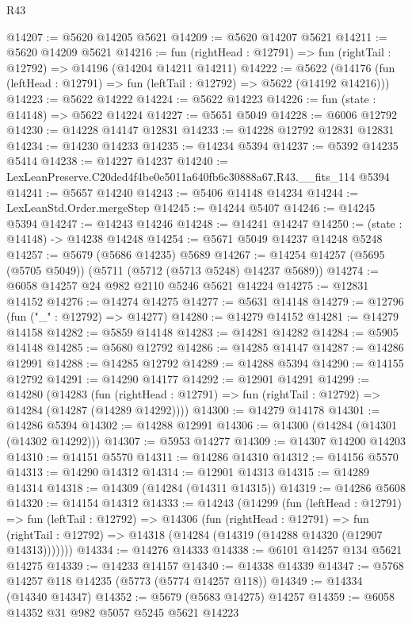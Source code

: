 \begin{lexlean}{R43}
\begin{coremodule}
@14207 := @5620 @14205 @5621
@14209 := @5620 @14207 @5621
@14211 := @5620 @14209 @5621
@14216 := fun (rightHead : @12791) => fun (rightTail : @12792) => @14196 (@14204 @14211 @14211)
@14222 := @5622
    (@14176 (fun (leftHead : @12791) => fun (leftTail : @12792) => @5622 (@14192 @14216)))
@14223 := @5622 @14222
@14224 := @5622 @14223
@14226 := fun (state : @14148) => @5622 @14224
@14227 := @5651 @5049
@14228 := @6006 @12792
@14230 := @14228 @14147 @12831
@14233 := @14228 @12792 @12831 @12831
@14234 := @14230 @14233
@14235 := @14234 @5394
@14237 := @5392 @14235 @5414
@14238 := @14227 @14237
@14240 := LexLeanPreserve.C20ded4f4be0e5011a640fb6c30888a67.R43.__fits_114 @5394
@14241 := @5657 @14240
@14243 := @5406 @14148 @14234
@14244 := LexLeanStd.Order.mergeStep
@14245 := @14244 @5407
@14246 := @14245 @5394
@14247 := @14243 @14246
@14248 := @14241 @14247
@14250 := (state : @14148) -> @14238 @14248
@14254 := @5671 @5049 @14237 @14248 @5248
@14257 := @5679 (@5686 @14235) @5689
@14267 := @14254 @14257 (@5695 (@5705 @5049)) (@5711 (@5712 (@5713 @5248) @14237 @5689))
@14274 := @6058 @14257 @24 @982 @2110 @5246 @5621 @14224
@14275 := @12831 @14152
@14276 := @14274 @14275
@14277 := @5631 @14148
@14279 := @12796 (fun ("_" : @12792) => @14277)
@14280 := @14279 @14152
@14281 := @14279 @14158
@14282 := @5859 @14148
@14283 := @14281 @14282
@14284 := @5905 @14148
@14285 := @5680 @12792
@14286 := @14285 @14147
@14287 := @14286 @12991
@14288 := @14285 @12792
@14289 := @14288 @5394
@14290 := @14155 @12792
@14291 := @14290 @14177
@14292 := @12901 @14291
@14299 := @14280
    (@14283
      (fun (rightHead : @12791) => fun (rightTail : @12792) => @14284 (@14287 (@14289 @14292))))
@14300 := @14279 @14178
@14301 := @14286 @5394
@14302 := @14288 @12991
@14306 := @14300 (@14284 (@14301 (@14302 @14292)))
@14307 := @5953 @14277
@14309 := @14307 @14200 @14203
@14310 := @14151 @5570
@14311 := @14286 @14310
@14312 := @14156 @5570
@14313 := @14290 @14312
@14314 := @12901 @14313
@14315 := @14289 @14314
@14318 := @14309 (@14284 (@14311 @14315))
@14319 := @14286 @5608
@14320 := @14154 @14312
@14333 := @14243
    (@14299
      (fun (leftHead : @12791) =>
      fun (leftTail : @12792) =>
      @14306
        (fun (rightHead : @12791) =>
        fun (rightTail : @12792) => @14318 (@14284 (@14319 (@14288 @14320 (@12907 @14313)))))))
@14334 := @14276 @14333
@14338 := @6101 @14257 @134 @5621 @14275
@14339 := @14233 @14157
@14340 := @14338 @14339
@14347 := @5768 @14257 @118 @14235 (@5773 (@5774 @14257 @118))
@14349 := @14334 (@14340 @14347)
@14352 := @5679 (@5683 @14275) @14257
@14359 := @6058 @14352 @31 @982 @5057 @5245 @5621 @14223

\end{coremodule}
\end{lexlean}
